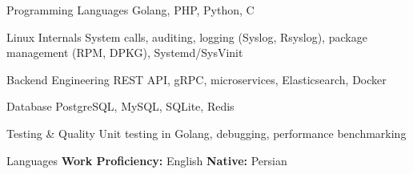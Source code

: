 

\begin{cvskills}


  \cvskill
    {Programming Languages} %
    {Golang, PHP, Python, C} %

  \cvskill
    {Linux Internals} %
    {System calls, auditing, logging (Syslog, Rsyslog), package management (RPM, DPKG), Systemd/SysVinit} %


\cvskill
{Backend Engineering} %
{REST API, gRPC, microservices, Elasticsearch, Docker} %

\cvskill
{Database} %
{PostgreSQL, MySQL, SQLite, Redis} %

\cvskill
{Testing \& Quality} %
{Unit testing in Golang, debugging, performance benchmarking} %

  \cvskill
    {Languages} %
    {\textbf{Work Proficiency:} English \qquad \textbf{Native:} Persian} %

\end{cvskills}

